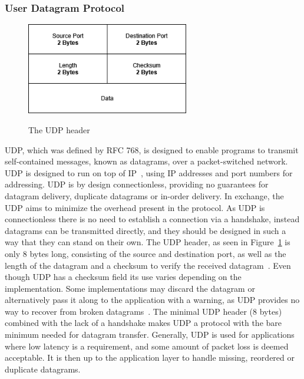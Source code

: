 \documentclass[english, 12pt, a4paper, elec, utf8, a-2b, online]{aaltothesis}
\begin{document}
\subsubsection{User Datagram Protocol \label{UDP}}
\label{sec:udp}
\begin{figure}[b]
	\centering
	\includegraphics[alt={A block diagram of the UDP header format, detailing its fields and their sizes.}, height=4cm]{./images/udp_header.png}
	\caption{The UDP header}
	\label{fig:udp_header}
\end{figure}
UDP, which was defined by RFC 768, is designed to
enable programs to transmit self-contained messages, known as datagrams, over a
packet-switched network. UDP is designed to run on top of IP~\cite{rfc791},
using IP addresses and port numbers for addressing. UDP is by design connectionless,
providing no guarantees for datagram delivery, duplicate datagrams or in-order
delivery. In exchange, the UDP aims to minimize the overhead present in the protocol.
As UDP is connectionless there is no need to establish a connection via a handshake,
instead datagrams can be transmitted directly, and they should be designed in
such a way that they can stand on their own. The UDP header, as seen in Figure~\ref{fig:udp_header}
is only 8 bytes long,
consisting of the source and destination port, as well as the length of the datagram
and a checksum to verify the received datagram~\cite{rfc768}. Even though UDP has
a checksum field its use varies depending on the implementation. Some implementations
may discard the datagram or alternatively pass it along to the application with a 
warning, as UDP provides no way to recover from broken datagrams~\cite{compute_rnetworking}. The minimal UDP
header (8 bytes) combined with the lack of a handshake makes UDP a protocol with
the bare minimum needed for datagram transfer.
Generally, UDP is used for applications where low latency is a requirement, and some
amount of packet loss is deemed acceptable. It is then up to the application layer to
handle missing, reordered or duplicate datagrams.
\end{document}
